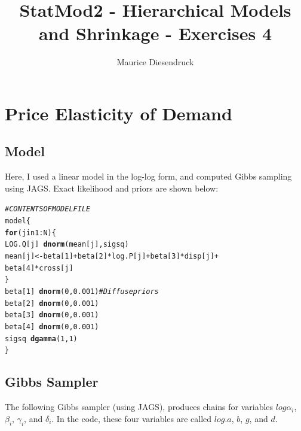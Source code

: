 \documentclass[12pt,letterpaper]{article}\usepackage[]{graphicx}\usepackage[]{color}
\author{Maurice Diesendruck\vspace{-2ex}}
\title{StatMod2 - Hierarchical Models and Shrinkage - Exercises 4\vspace{-1ex}}
\makeatletter
\newcommand{\hlcom}[1]{\textcolor[rgb]{0.678,0.584,0.686}{\textit{#1}}}%
\newcommand{\hlkwd}[1]{\textcolor[rgb]{0.737,0.353,0.396}{\textbf{#1}}}%
\newenvironment{kframe}{%
 \def\at@end@of@kframe{}%
 \ifinner\ifhmode%
  \def\at@end@of@kframe{\end{minipage}}%
  \begin{minipage}{\columnwidth}%
 \fi\fi%
 \def\FrameCommand##1{\hskip\@totalleftmargin \hskip-\fboxsep
 \colorbox{shadecolor}{##1}\hskip-\fboxsep
     \hskip-\linewidth \hskip-\@totalleftmargin \hskip\columnwidth}%
 \MakeFramed {\advance\hsize-\width
   \@totalleftmargin\z@ \linewidth\hsize
   \@setminipage}}%
 {\par\unskip\endMakeFramed%
 \at@end@of@kframe}
\newenvironment{knitrout}{}{} %
\makeatother
\begin{document}
\maketitle
\setcounter{section}{1}

\section{Price Elasticity of Demand}

\subsection{Model}
Here, I used a linear model in the log-log form, and computed Gibbs sampling
using JAGS. Exact likelihood and priors are shown below:\\

\begin{knitrout}
\color{fgcolor}\begin{kframe}
\begin{alltt}
\hlcom{# CONTENTS OF MODEL FILE}
model \{
\hlkwd{for} (j in 1:N) \{
  LOG.Q[j] ~ \hlkwd{dnorm}(mean[j], sigsq)
  mean[j] <- beta[1] + beta[2]*log.P[j] + beta[3]*disp[j] +
             beta[4]*cross[j]
\}
beta[1] ~ \hlkwd{dnorm}(0,0.001) \hlcom{# Diffuse priors}
beta[2] ~ \hlkwd{dnorm}(0,0.001)
beta[3] ~ \hlkwd{dnorm}(0,0.001)
beta[4] ~ \hlkwd{dnorm}(0,0.001)
sigsq ~ \hlkwd{dgamma}(1, 1)
\}
\end{alltt}
\end{kframe}
\end{knitrout}

\subsection{Gibbs Sampler}

The following Gibbs sampler (using JAGS), produces chains for variables
$log\alpha_i$, $\beta_i$, $\gamma_i$, and $\delta_i$. In the code, these
four variables are called $log.a$, $b$, $g$, and $d$.
\end{document}
